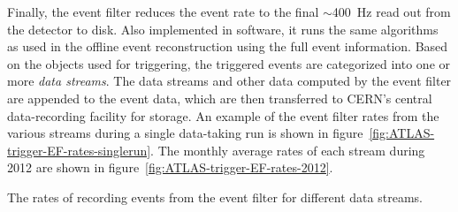 Finally, the event filter reduces the event rate to the final $\sim$\SI{400}{\hertz} read out from the detector to disk. Also implemented in software, it runs the same algorithms as used in the offline event reconstruction using the full event information. Based on the objects used for triggering, the triggered events are categorized into one or more \emph{data streams}. The data streams and other data computed by the event filter are appended to the event data, which are then transferred to CERN’s central data-recording facility for storage. An example of the event filter rates from the various streams during a single data-taking run is shown in figure~\ref{fig:ATLAS-trigger-EF-rates-singlerun}. The monthly average rates of each stream during 2012 are shown in figure~\ref{fig:ATLAS-trigger-EF-rates-2012}.

\begin{table}[htbp]
	\centering
	\hfill
	\caption{The rates of recording events from the event filter for different data streams.}
	\label{fig:ATLAS-trigger-EF-rates}
\end{table}


\printbibliography